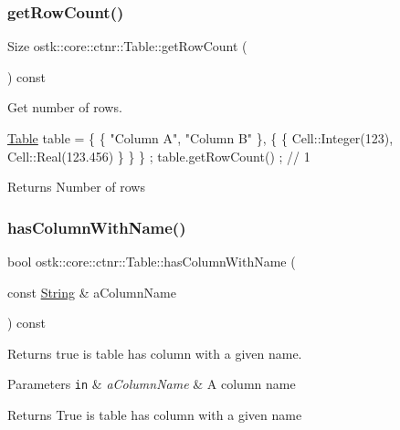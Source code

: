 \subsubsection{\texorpdfstring{get\+Row\+Count()}{getRowCount()}}
{\footnotesize\ttfamily Size ostk\+::core\+::ctnr\+::\+Table\+::get\+Row\+Count (\begin{DoxyParamCaption}{ }\end{DoxyParamCaption}) const}



Get number of rows. 


\begin{DoxyCode}
\hyperlink{classostk_1_1core_1_1ctnr_1_1_table_a1b799fa804faf23f9dd4905df90a5cd7}{Table} table = \{ \{ \textcolor{stringliteral}{"Column A"}, \textcolor{stringliteral}{"Column B"} \}, \{ \{ Cell::Integer(123), Cell::Real(123.456) \} \} \} ;
table.getRowCount() ; \textcolor{comment}{// 1}
\end{DoxyCode}


\begin{DoxyReturn}{Returns}
Number of rows 
\end{DoxyReturn}
\mbox{\label{classostk_1_1core_1_1ctnr_1_1_table_a4c68a783ba37aa13d3b5802dd72a442d}} 
\subsubsection{\texorpdfstring{has\+Column\+With\+Name()}{hasColumnWithName()}}
{\footnotesize\ttfamily bool ostk\+::core\+::ctnr\+::\+Table\+::has\+Column\+With\+Name (\begin{DoxyParamCaption}\item[{const \hyperlink{classostk_1_1core_1_1types_1_1_string}{String} \&}]{a\+Column\+Name }\end{DoxyParamCaption}) const}



Returns true is table has column with a given name. 


\begin{DoxyParams}[1]{Parameters}
\mbox{\tt in}  & {\em a\+Column\+Name} & A column name \\
\hline
\end{DoxyParams}
\begin{DoxyReturn}{Returns}
True is table has column with a given name 
\end{DoxyReturn}
\mbox{\label{classostk_1_1core_1_1ctnr_1_1_table_a8e56fe6a310edb33ea1cbc69c2609ee0}} 
